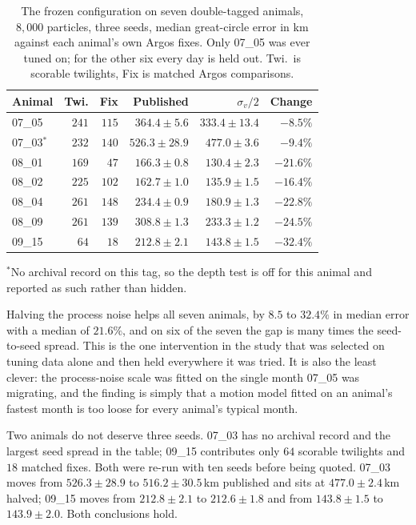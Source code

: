 \documentclass[conference]{IEEEtran}
\begin{document}
\begin{table}[t]
\caption{The frozen configuration on seven double-tagged animals, $8{,}000$
particles, three seeds, median great-circle error in \si{\km} against each
animal's own Argos fixes. Only 07\_05 was ever tuned on; for the other six
every day is held out. Twi.\ is scorable twilights, Fix is matched Argos
comparisons.}
\label{tab:cohort}
\centering
\small
\begin{tabular}{@{}lrrrrr@{}}
\toprule
Animal & Twi. & Fix & Published & $\sigma_v/2$ & Change \\
\midrule
07\_05            & $241$ & $115$ & $364.4 \pm 5.6$  & $333.4 \pm 13.4$ & $-8.5\%$ \\
07\_03$^{*}$      & $232$ & $140$ & $526.3 \pm 28.9$ & $477.0 \pm 3.6$  & $-9.4\%$ \\
08\_01            & $169$ & $47$  & $166.3 \pm 0.8$  & $130.4 \pm 2.3$  & $-21.6\%$ \\
08\_02            & $225$ & $102$ & $162.7 \pm 1.0$  & $135.9 \pm 1.5$  & $-16.4\%$ \\
08\_04            & $261$ & $148$ & $234.4 \pm 0.9$  & $180.9 \pm 1.3$  & $-22.8\%$ \\
08\_09            & $261$ & $139$ & $308.8 \pm 1.3$  & $233.3 \pm 1.2$  & $-24.5\%$ \\
09\_15            & $64$  & $18$  & $212.8 \pm 2.1$  & $143.8 \pm 1.5$  & $-32.4\%$ \\
\bottomrule
\end{tabular}

\vspace{2pt}
\footnotesize $^{*}$No archival record on this tag, so the depth test is off
for this animal and reported as such rather than hidden.
\end{table}

Halving the process noise helps all seven animals, by $8.5$ to $32.4\%$ in
median error with a median of $21.6\%$, and on six of the seven the gap is many
times the seed-to-seed spread. This is the one intervention in the study that
was selected on tuning data alone and then held everywhere it was tried. It is
also the least clever: the process-noise scale was fitted on the single month
07\_05 was migrating, and the finding is simply that a motion model fitted on
an animal's fastest month is too loose for every animal's typical month.

Two animals do not deserve three seeds. 07\_03 has no archival record and the
largest seed spread in the table; 09\_15 contributes only $64$ scorable
twilights and $18$ matched fixes. Both were re-run with ten seeds before being
quoted. 07\_03 moves from $526.3 \pm 28.9$ to $516.2 \pm 30.5$\,\si{\km}
published and sits at $477.0 \pm 2.4$\,\si{\km} halved; 09\_15 moves from
$212.8 \pm 2.1$ to $212.6 \pm 1.8$ and from $143.8 \pm 1.5$ to
$143.9 \pm 2.0$. Both conclusions hold.
\end{document}
